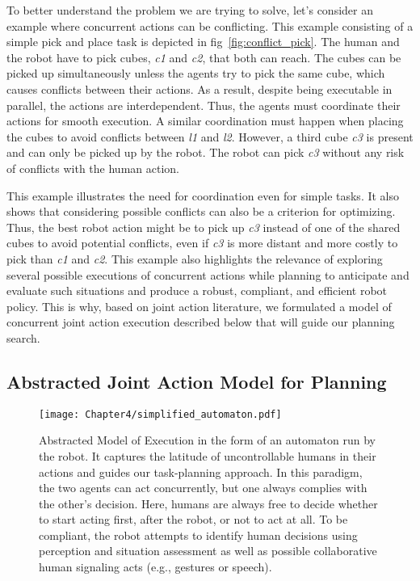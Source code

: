 To better understand the problem we are trying to solve, let's consider an example where concurrent actions can be conflicting. This example consisting of a simple pick and place task is depicted in fig~\ref{fig:conflict_pick}. The human and the robot have to pick cubes, \emph{c1} and \emph{c2}, that both can reach. 
The cubes can be picked up simultaneously unless the agents try to pick the same cube, which causes conflicts between their actions. As a result, despite being executable in parallel, the actions are interdependent. Thus, the agents must coordinate their actions for smooth execution.
A similar coordination must happen when placing the cubes to avoid conflicts between \emph{l1} and \emph{l2}.
However, a third cube \emph{c3} is present and can only be picked up by the robot. The robot can pick \emph{c3} without any risk of conflicts with the human action. 

This example illustrates the need for coordination even for simple tasks. It also shows that considering possible conflicts can also be a criterion for optimizing. Thus, the best robot action might be to pick up \emph{c3} instead of one of the shared cubes to avoid potential conflicts, even if \emph{c3} is more distant and more costly to pick than \emph{c1} and \emph{c2}.
This example also highlights the relevance of exploring several possible executions of concurrent actions while planning to anticipate and evaluate such situations and produce a robust, compliant, and efficient robot policy. This is why, based on joint action literature, we formulated a model of concurrent joint action execution described below that will guide our planning search.

\subsection{Abstracted Joint Action Model for Planning}

\begin{figure}
    \centering
    \texttt{[image: Chapter4/simplified\_automaton.pdf]}
    \caption{
    Abstracted Model of Execution in the form of an automaton run by the robot. It captures the latitude of uncontrollable humans in their actions and guides our task-planning approach.
    In this paradigm, the two agents can act concurrently, but one always complies with the other's decision.
    Here, humans are always free to decide whether to start acting first, after the robot, or not to act at all.
    To be compliant, the robot attempts to identify human decisions using perception and situation assessment as well as possible collaborative human signaling acts (e.g., gestures or speech).
    }
    \label{fig:simplified_model_exec}
\end{figure}

